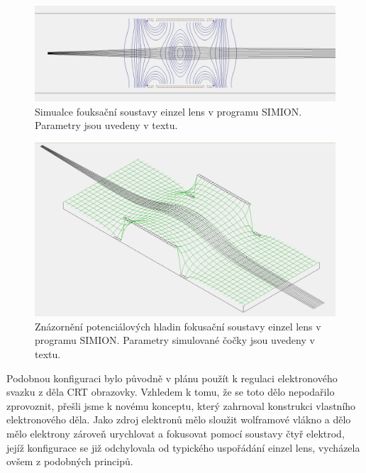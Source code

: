 
\begin{figure}[htbp!]
\centering
\includegraphics[width = \linewidth]{Figure/05/3a.jpg}
\caption{Simualce fouksační soustavy einzel lens v programu SIMION. Parametry jsou uvedeny v textu.}
\label{05simulaceEinzelLens}
\end{figure}

\begin{figure}[htbp!]
\centering
\includegraphics[width = \linewidth]{Figure/05/3b.jpg}
\caption{Znázornění potenciálových hladin fokusační soustavy einzel lens v programu SIMION. Parametry simulované čočky jsou uvedeny v textu.}
\label{05simulaceEinzelLensPotencial}
\end{figure}

Podobnou konfiguraci bylo původně v plánu použít k regulaci elektronového svazku z děla CRT obrazovky. Vzhledem k tomu, že se toto dělo nepodařilo zprovoznit, přešli jsme k novému konceptu, který zahrnoval konstrukci vlastního elektronového děla. Jako zdroj elektronů mělo sloužit wolframové vlákno a dělo mělo elektrony zároveň urychlovat a fokusovat pomocí soustavy čtyř elektrod, jejíž konfigurace se již odchylovala od typického uspořádání einzel lens, vycházela ovšem z podobných principů.\\


